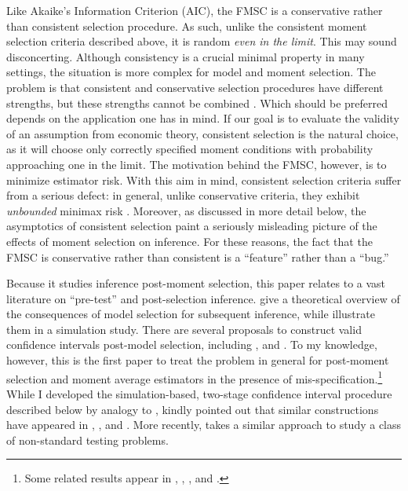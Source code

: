 Like Akaike's Information Criterion (AIC), the FMSC is a conservative rather than consistent selection procedure.
As such, unlike the consistent moment selection criteria described above, it is random \emph{even in the limit}.
This may sound disconcerting.
Although consistency is a crucial minimal property in many settings, the situation is more complex for model and moment selection.
The problem is that consistent and conservative selection procedures have different strengths, but these strengths cannot be combined \cite{Yang2005}.
Which should be preferred depends on the application one has in mind.
If our goal is to evaluate the validity of an assumption from economic theory, consistent selection is the natural choice, as it will choose only correctly specified moment conditions with probability approaching one in the limit.
The motivation behind the FMSC, however, is to minimize estimator risk.
With this aim in mind, consistent selection criteria suffer from a serious defect: in general, unlike conservative criteria, they exhibit \emph{unbounded} minimax risk \citep{LeebPoetscher2008}.
Moreover, as discussed in more detail below, the asymptotics of consistent selection paint a seriously misleading picture of the effects of moment selection on inference.
For these reasons, the fact that the FMSC is conservative rather than consistent is a ``feature'' rather than a ``bug.''

Because it studies inference post-moment selection, this paper relates to a vast literature on ``pre-test'' and post-selection inference.
\citet{LeebPoetscher2005, LeebPoetscher2009} give a theoretical overview of the consequences of model selection for subsequent inference, while \cite{Demetrescu} illustrate them in a simulation study. 
There are several proposals to construct valid confidence intervals post-model selection, including \cite{Kabaila1998}, \cite{HjortClaeskens} and \cite{KabailaLeeb2006}. 
To my knowledge, however, this is the first paper to treat the problem in general for post-moment selection and moment average estimators in the presence of mis-specification.\footnote{Some related results appear in \cite{Berkowitz}, \cite{Guggenberger2010}, \cite{Guggenberger2012}, and \cite{GuggenbergerKumar}.}
While I developed the simulation-based, two-stage confidence interval procedure described below by analogy to \cite{ClaeskensHjortbook}, \cite{Leeb} kindly pointed out that similar constructions have appeared in \cite{Loh1985}, \cite{Berger1994}, and \cite{Silvapulle1996}. More recently, \cite{McCloskey} takes a similar approach to study a class of non-standard testing problems.

